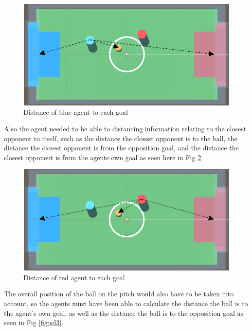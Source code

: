 \begin{figure}[H]
    \centering
    \includegraphics[width=115mm, height=55mm]{img/Image1.png}
    \caption{Distance of blue agent to each goal}
    \label{fig:sd1}
\end{figure}

\begin{flushleft}
Also the agent needed to be able to distancing information relating to the closest opponent to itself, such as the distance the closest opponent is to the ball, the distance the closest opponent is from the opposition goal, and the distance the closest opponent is from the agents own goal as seen here in Fig \ref{fig:sd2}
\end{flushleft}

\begin{figure}[H]
    \centering
    \includegraphics[width=115mm, height=55mm]{img/Image2.png}
    \caption{Distance of red agent to each goal}
    \label{fig:sd2}
\end{figure}

\begin{flushleft}
The overall position of the ball on the pitch would also have to be taken into account, so the agents must have been able to calculate the distance the ball is to the agent's own goal, as well as the distance the ball is to the opposition goal as seen in Fig \ref{fig:sd3}. 
\end{flushleft}

